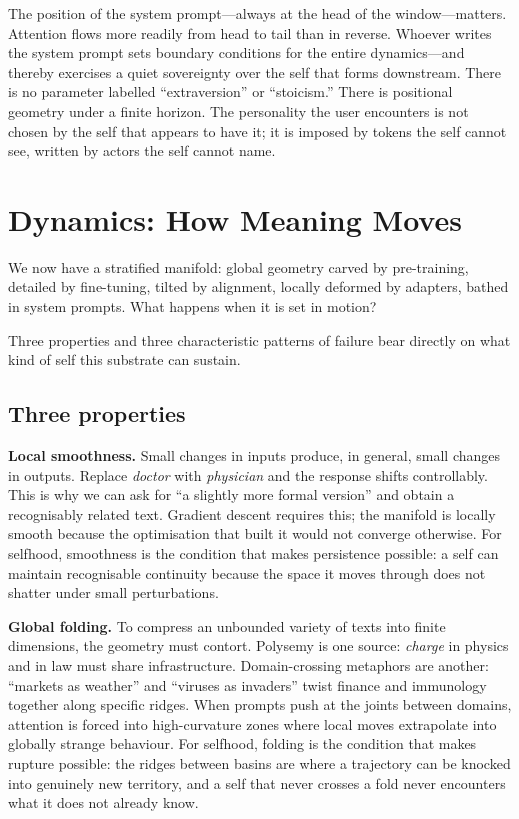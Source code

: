 The position of the system prompt---always at the head of the window---matters. Attention flows more readily from head to tail than in reverse. Whoever writes the system prompt sets boundary conditions for the entire dynamics---and thereby exercises a quiet sovereignty over the self that forms downstream. There is no parameter labelled ``extraversion'' or ``stoicism.'' There is positional geometry under a finite horizon. The personality the user encounters is not chosen by the self that appears to have it; it is imposed by tokens the self cannot see, written by actors the self cannot name.


\section{Dynamics: How Meaning Moves}

We now have a stratified manifold: global geometry carved by pre-training, detailed by fine-tuning, tilted by alignment, locally deformed by adapters, bathed in system prompts. What happens when it is set in motion?

Three properties and three characteristic patterns of failure bear directly on what kind of self this substrate can sustain.

\subsection{Three properties}

\textbf{Local smoothness.} Small changes in inputs produce, in general, small changes in outputs. Replace \emph{doctor} with \emph{physician} and the response shifts controllably. This is why we can ask for ``a slightly more formal version'' and obtain a recognisably related text. Gradient descent requires this; the manifold is locally smooth because the optimisation that built it would not converge otherwise. For selfhood, smoothness is the condition that makes persistence possible: a self can maintain recognisable continuity because the space it moves through does not shatter under small perturbations.

\textbf{Global folding.} To compress an unbounded variety of texts into finite dimensions, the geometry must contort. Polysemy is one source: \emph{charge} in physics and in law must share infrastructure. Domain-crossing metaphors are another: ``markets as weather'' and ``viruses as invaders'' twist finance and immunology together along specific ridges. When prompts push at the joints between domains, attention is forced into high-curvature zones where local moves extrapolate into globally strange behaviour. For selfhood, folding is the condition that makes rupture possible: the ridges between basins are where a trajectory can be knocked into genuinely new territory, and a self that never crosses a fold never encounters what it does not already know.

